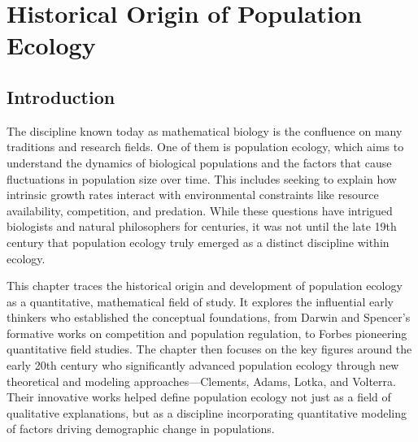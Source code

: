\chapter{Historical Origin of Population Ecology}
\label{ch:12} 



\vspace{1cm}

\section{Introduction}

The discipline known today as mathematical biology is the confluence on many traditions and research fields. One of them is population ecology, which aims to understand the dynamics of biological populations and the factors that cause fluctuations in population size over time. This includes seeking to explain how intrinsic growth rates interact with environmental constraints like resource availability, competition, and predation. While these questions have intrigued biologists and natural philosophers for centuries, it was not until the late 19th century that population ecology truly emerged as a distinct discipline within ecology.

This chapter traces the historical origin and development of population ecology as a quantitative, mathematical field of study. It explores the influential early thinkers who established the conceptual foundations, from Darwin and Spencer's formative works on competition and population regulation, to Forbes pioneering quantitative field studies. The chapter then focuses on the key figures around the early 20th century who significantly advanced population ecology through new theoretical and modeling approaches---Clements, Adams, Lotka, and Volterra. Their innovative works helped define population ecology not just as a field of qualitative explanations, but as a discipline incorporating quantitative modeling of factors driving demographic change in populations.

